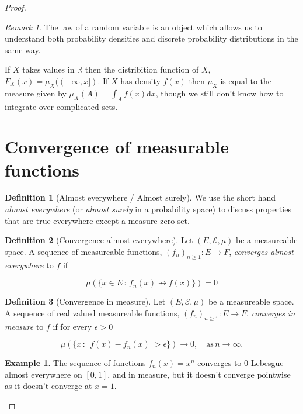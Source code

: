 \documentclass[
]{book}
\theoremstyle{definition}
\newtheorem{definition}{Definition}[chapter]
\theoremstyle{definition}
\newtheorem{example}{Example}[chapter]
\theoremstyle{definition}
\theoremstyle{definition}
\theoremstyle{remark}
\newtheorem*{remark}{Remark}
\begin{document}
\begin{proof}
\begin{remark}
The law of a random variable is an object which allows us to understand both probability densities and discrete probability distributions in the same way.

If \(X\) takes values in \(\mathbb{R}\) then the distribition function of \(X\), \(F_X(x) = \mu_X((-\infty, x])\). If \(X\) has density \(f(x)\) then \(\mu_X\) is equal to the measure given by \(\mu_X(A) = \int_A f(x) \mathrm{d}x\), though we still don't know how to integrate over complicated sets.
\end{remark}

\hypertarget{convergence-of-measurable-functions}{%
\section{Convergence of measurable functions}\label{convergence-of-measurable-functions}}

\begin{definition}[Almost everywhere / Almost surely]
We use the short hand \emph{almost everywhere} (or \emph{almost surely} in a probability space) to discuss properties that are true everywhere except a measure zero set.
\end{definition}

\begin{definition}[Convergence almost everywhere]
Let \((E, \mathcal{E}, \mu)\) be a measureable space. A sequence of measureable functions, \((f_n)_{n \geq 1}: E \rightarrow F\), \emph{converges almost everywhere} to \(f\) if

\[ \mu \left( \{ x \in E \,:\, f_n(x) \not\to f(x) \} \right) = 0 \]
\end{definition}

\begin{definition}[Convergence in measure]
Let \((E, \mathcal{E}, \mu)\) be a measureable space. A sequence of real valued measureable functions, \((f_n)_{n \geq 1}: E \rightarrow F\), \emph{converges in measure} to \(f\) if for every \(\epsilon > 0\)

\[ \mu \left( \{ x \, :\, |f(x) - f_n(x)| > \epsilon \} \right) \rightarrow 0, \quad \mbox{as}\, n \rightarrow \infty. \]
\end{definition}

\begin{example}
The sequence of functions \(f_n(x) = x^n\) converges to \(0\) Lebesgue almost everywhere on \([0,1]\), and in measure, but it doesn't converge pointwise as it doesn't converge at \(x=1\).
\end{example}


\end{proof}
\end{document}
